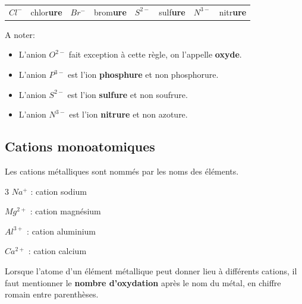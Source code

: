 \documentclass[
  11pt,
  a4paper,
  openany]{book}
\providecommand{\tightlist}{%
  \setlength{\itemsep}{0pt}\setlength{\parskip}{0pt}}
\begin{document}
\begin{longtable}[]{@{}
  >{\centering\arraybackslash}p{}
  >{\raggedright\arraybackslash}p{}
  >{\centering\arraybackslash}p{}
  >{\raggedright\arraybackslash}p{}
  >{\centering\arraybackslash}p{}
  >{\raggedright\arraybackslash}p{}
  >{\centering\arraybackslash}p{}
  >{\centering\arraybackslash}p{}@{}}
\toprule\noalign{}
\endhead
\bottomrule\noalign{}
\endlastfoot
\(Cl^-\) & chlor\textbf{ure} & \(Br^-\) & brom\textbf{ure} & \(S^{2-}\) & sulf\textbf{ure} & \(N^{3-}\) & nitr\textbf{ure} \\
\end{longtable}

A noter:

\begin{itemize}
\tightlist
\item
  L'anion \(O^{2-}\) fait exception à cette règle, on l'appelle \textbf{oxyde}.
\item
  L'anion \(P^{3-}\) est l'ion \textbf{phosphure} et non phosphorure.
\item
  L'anion \(S^{2-}\) est l'ion \textbf{sulfure} et non soufrure.
\item
  L'anion \(N^{3-}\) est l'ion \textbf{nitrure} et non azoture.
\end{itemize}

\newpage

\subsection{Cations monoatomiques}\label{cations-monoatomiques}

Les cations métalliques sont nommés par les noms des éléments.

\begin{multicols}{3}
\(Na^+\) : cation sodium

\(Mg^{2+}\) : cation magnésium

\(Al^{3+}\) : cation aluminium

\(Ca^{2+}\) : cation calcium

\end{multicols}

Lorsque l'atome d'un élément métallique peut donner lieu à différents cations, il faut mentionner le \textbf{nombre d'oxydation} après le nom du métal, en chiffre romain entre parenthèses.
\end{document}
